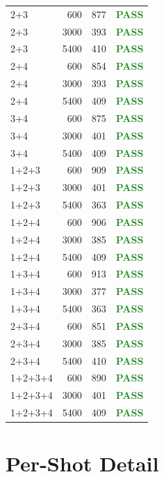 \documentclass[11pt]{article}
\begin{document}
\begin{longtable}{l r r l}
2+3 & 600 & 877 & \textcolor{ForestGreen}{\textbf{PASS}} \\
2+3 & 3000 & 393 & \textcolor{ForestGreen}{\textbf{PASS}} \\
2+3 & 5400 & 410 & \textcolor{ForestGreen}{\textbf{PASS}} \\
2+4 & 600 & 854 & \textcolor{ForestGreen}{\textbf{PASS}} \\
2+4 & 3000 & 393 & \textcolor{ForestGreen}{\textbf{PASS}} \\
2+4 & 5400 & 409 & \textcolor{ForestGreen}{\textbf{PASS}} \\
3+4 & 600 & 875 & \textcolor{ForestGreen}{\textbf{PASS}} \\
3+4 & 3000 & 401 & \textcolor{ForestGreen}{\textbf{PASS}} \\
3+4 & 5400 & 409 & \textcolor{ForestGreen}{\textbf{PASS}} \\
1+2+3 & 600 & 909 & \textcolor{ForestGreen}{\textbf{PASS}} \\
1+2+3 & 3000 & 401 & \textcolor{ForestGreen}{\textbf{PASS}} \\
1+2+3 & 5400 & 363 & \textcolor{ForestGreen}{\textbf{PASS}} \\
1+2+4 & 600 & 906 & \textcolor{ForestGreen}{\textbf{PASS}} \\
1+2+4 & 3000 & 385 & \textcolor{ForestGreen}{\textbf{PASS}} \\
1+2+4 & 5400 & 409 & \textcolor{ForestGreen}{\textbf{PASS}} \\
1+3+4 & 600 & 913 & \textcolor{ForestGreen}{\textbf{PASS}} \\
1+3+4 & 3000 & 377 & \textcolor{ForestGreen}{\textbf{PASS}} \\
1+3+4 & 5400 & 363 & \textcolor{ForestGreen}{\textbf{PASS}} \\
2+3+4 & 600 & 851 & \textcolor{ForestGreen}{\textbf{PASS}} \\
2+3+4 & 3000 & 385 & \textcolor{ForestGreen}{\textbf{PASS}} \\
2+3+4 & 5400 & 410 & \textcolor{ForestGreen}{\textbf{PASS}} \\
1+2+3+4 & 600 & 890 & \textcolor{ForestGreen}{\textbf{PASS}} \\
1+2+3+4 & 3000 & 401 & \textcolor{ForestGreen}{\textbf{PASS}} \\
1+2+3+4 & 5400 & 409 & \textcolor{ForestGreen}{\textbf{PASS}} \\
\hline
\end{longtable}

\clearpage
\section*{Per-Shot Detail}
\end{document}
